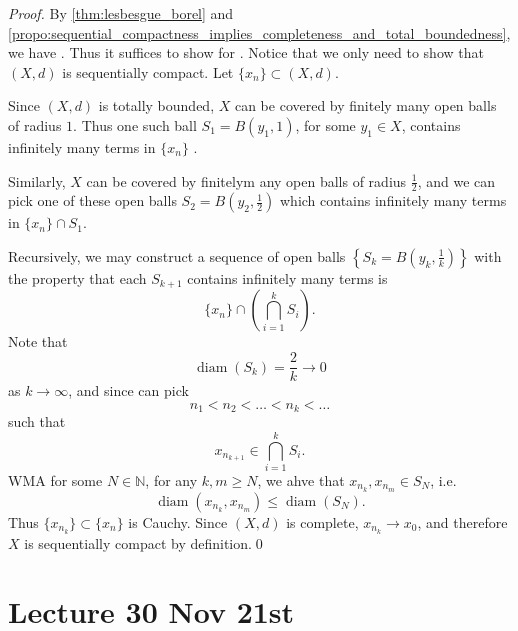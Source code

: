 \documentclass[notoc,notitlepage]{tufte-book}
\DeclareMathOperator{\diam}{diam }
\begin{document}
\begin{proof}
  By \cref{thm:lesbesgue_borel} and \cref{propo:sequential_compactness_implies_completeness_and_total_boundedness}, we have . Thus it suffices to show for . Notice that we only need to show that $(X, d)$ is sequentially compact. Let $\{ x_n \} \subset (X, d)$.
  
  Since $(X, d)$ is totally bounded, $X$ can be covered by finitely many open balls of radius $1$. Thus one such ball $S_1 = B(y_1, 1)$, for some $y_1 \in X$, contains infinitely many terms in $\{ x_n \}$ .

  Similarly, $X$ can be covered by finitelym any open balls of radius $\frac{1}{2}$, and we can pick one of these open balls $S_2 = B\left(y_2, \frac{1}{2}\right)$ which contains infinitely many terms in $\{ x_n \} \cap S_1$.

  Recursively, we may construct a sequence of open balls $\left\{ S_k = B\left(y_k, \frac{1}{k}\right) \right\}$ with the property that each $S_{k + 1}$ contains infinitely many terms is
  \begin{equation*}
    \{ x_n \} \cap \left( \bigcap_{i=1}^{k} S_i \right).
  \end{equation*}
  Note that
  \begin{equation*}
    \diam(S_k) = \frac{2}{k} \to 0
  \end{equation*}
  as $k \to \infty$, and since can pick
  \begin{equation*}
    n_1 < n_2 < \hdots < n_k < \hdots
  \end{equation*}
  such that
  \begin{equation*}
    x_{n_{k + 1}} \in \bigcap_{i=1}^{k} S_i.
  \end{equation*}
  WMA for some $N \in \mathbb{N}$, for any $k, m \geq N$, we ahve that $x_{n_k}, x_{n_m} \in S_N$, i.e.
  \begin{equation*}
    \diam(x_{n_k}, x_{n_m}) \leq \diam(S_N).
  \end{equation*}
  Thus $\{ x_{n_k} \} \subset \{ x_n \}$ is Cauchy. Since $(X, d)$ is complete, $x_{n_k} \to x_0$, and therefore $X$ is sequentially compact by definition.\qed\
\end{proof}



\chapter{Lecture 30 Nov 21st}%
\label{chp:lecture_30_nov_21st}
\end{document}
